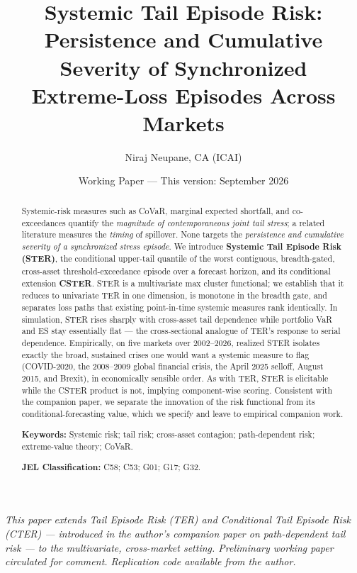 \documentclass[11pt]{article}
\title{\bfseries Systemic Tail Episode Risk:\\ Persistence and Cumulative Severity of Synchronized\\ Extreme-Loss Episodes Across Markets}
\author{Niraj Neupane, CA (ICAI)}
\affil{\normalsize Quantitative Researcher, Korvane \quad$\cdot$\quad Financial Economist, Calderyn Institute\\
\normalsize ORCID: 0009-0003-7026-7026 \quad$\cdot$\quad \texttt{nirajneupane17@gmail.com}}
\date{Working Paper --- This version: September 2026}
\begin{document}
\maketitle
\vspace{-1em}
\begin{center}\small\itshape
This paper extends Tail Episode Risk (TER) and Conditional Tail Episode Risk (CTER) --- introduced in the
author's companion paper on path-dependent tail risk --- to the multivariate, cross-market setting.
Preliminary working paper circulated for comment. Replication code available from the author.
\end{center}

\begin{abstract}
\noindent Systemic-risk measures such as CoVaR, marginal expected shortfall, and co-exceedances quantify the
\emph{magnitude of contemporaneous joint tail stress}; a related literature measures the \emph{timing} of
spillover. None targets the \emph{persistence and cumulative severity of a synchronized stress episode}. We
introduce \textbf{Systemic Tail Episode Risk (STER)}, the conditional upper-tail quantile of the worst
contiguous, breadth-gated, cross-asset threshold-exceedance episode over a forecast horizon, and its
conditional extension \textbf{CSTER}. STER is a multivariate max cluster functional; we establish that it
reduces to univariate TER in one dimension, is monotone in the breadth gate, and separates loss paths that
existing point-in-time systemic measures rank identically. In simulation, STER rises sharply with cross-asset
tail dependence while portfolio VaR and ES stay essentially flat --- the cross-sectional analogue of TER's
response to serial dependence. Empirically, on five markets over 2002--2026, realized STER isolates exactly
the broad, sustained crises one would want a systemic measure to flag (COVID-2020, the 2008--2009 global
financial crisis, the April 2025 selloff, August 2015, and Brexit), in economically sensible order. As with
TER, STER is elicitable while the CSTER product is not, implying component-wise scoring. Consistent with the
companion paper, we separate the innovation of the risk functional from its conditional-forecasting value,
which we specify and leave to empirical companion work.

\medskip
\noindent\textbf{Keywords:} Systemic risk; tail risk; cross-asset contagion; path-dependent risk;
extreme-value theory; CoVaR.

\noindent\textbf{JEL Classification:} C58; C53; G01; G17; G32.
\end{abstract}
\end{document}
